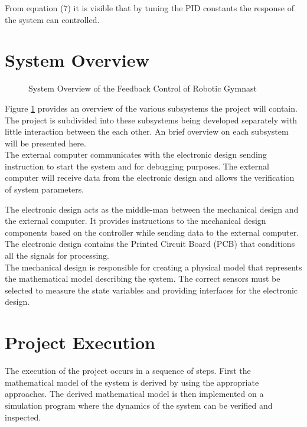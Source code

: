 \documentclass[a4paper,12pt]{article}
\begin{document}
 	From equation (7) it is visible that by tuning the PID constants the response of the system can controlled.
 	
 	
 	\section{System Overview}
 	\begin{figure}[h]
 		\centering
 		
 		\caption{System Overview of the Feedback Control of Robotic Gymnast}
 		\label{fig:system_overview}
 	\end{figure}
 	
 	
 	Figure \ref{fig:system_overview} provides an overview of the various subsystems the project will contain. The project is subdivided into these subsystems being developed separately with little interaction between the each other. An brief overview on each subsystem will be presented here.\\
 	
 	The external computer communicates with the electronic design sending instruction to start the system and for debugging purposes. The external computer will receive data from the electronic design and allows the verification of system parameters.
 	
 	The electronic design acts as the middle-man between the mechanical design and the external computer. It provides instructions to the mechanical design components based on the controller while sending data to the external computer. The electronic design contains the Printed Circuit Board (PCB) that conditions all the signals for processing.\\
 	
 	The mechanical design is responsible for creating a physical model that represents the mathematical model describing the system. The correct sensors must be selected to measure the state variables and providing interfaces for the electronic design.
  	
  	\section{Project Execution}
 	
 	The execution of the project occurs in a sequence of steps. First the mathematical model of the system is derived by using the appropriate approaches. The derived mathematical model is then implemented on a simulation program where the dynamics of the system can be verified and inspected.
 	
\end{document}
